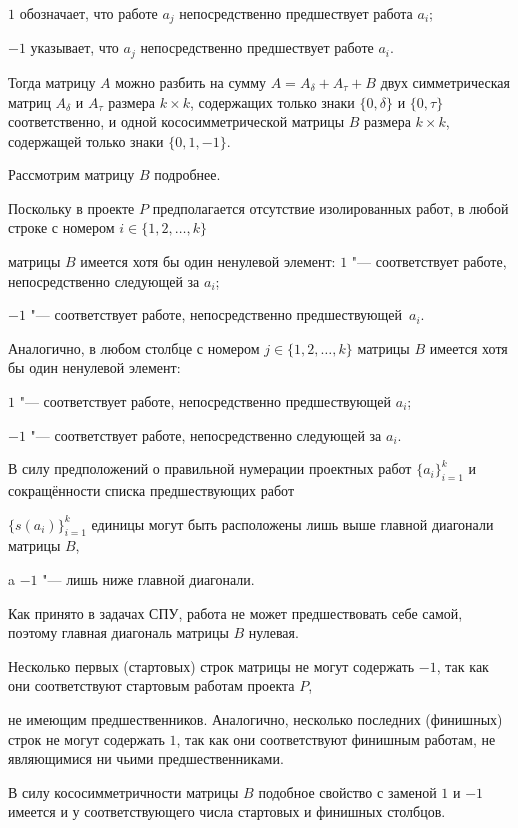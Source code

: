 $1$ обозначает, что работе $a_{j}$ непосредственно предшествует работа $a_i$;

$-1$ указывает, что $a_{j}$ непосредственно предшествует работе $a_i$. 

Тогда матрицу $A$ можно разбить на сумму $A=A_{\delta}+A_{\tau}+B$ двух симметрическая матриц $A_{\delta}$ и $A_{\tau}$ размера $k{\times} k$,  содержащих только знаки $\{0, \delta\}$ и $\{0, \tau\}$ соответственно, и одной кососимметрической матрицы $B$ размера $k{\times} k$,  содержащей только знаки \mbox{$\{0, 1, {-1}\}$.}



Рассмотрим матрицу $B$ подробнее. 

Поскольку в проекте $P$ предполагается отсутствие изолированных работ, в любой строке с номером $i\in \{1 ,2, \dots, k\}$ 

матрицы $B$ имеется хотя бы один ненулевой элемент: $1$ "--- соответствует работе, непосредственно следующей за $a_i$; 

$-1$ "--- соответствует работе, непосредственно предшествующей~$a_i$.

Аналогично, в любом столбце с номером $j\in \{1, 2, \dots, k\}$ матрицы $B$ имеется хотя бы один ненулевой элемент: 

$1$ "--- соответствует работе, непосредственно предшествующей $a_i$; 

$-1$ "--- соответствует работе, непосредственно следующей за $a_i$.



В силу предположений о правильной нумерации проектных работ $\{a_i\}^{k}_{i=1}$ и сокращённости списка предшествующих работ 

$\{s(a_i)\}^{k}_{i=1}$ единицы могут быть расположены лишь выше главной диагонали матрицы $B$, 

a $-1$ "--- лишь ниже главной диагонали. 

Как принято в задачах СПУ, работа не может предшествовать себе самой, поэтому главная диагональ матрицы $B$ нулевая. 

Несколько первых (стартовых) строк матрицы не могут содержать $-1$, так как они соответствуют стартовым работам проекта $P$,

не имеющим предшественников. Аналогично, несколько последних (финишных) строк не могут содержать $1$, так как они соответствуют финишным работам, не являющимися ни чьими предшественниками. 

В силу кососимметричности матрицы $B$ подобное свойство с заменой $1$ и $-1$ имеется и у соответствующего числа стартовых и финишных столбцов.





